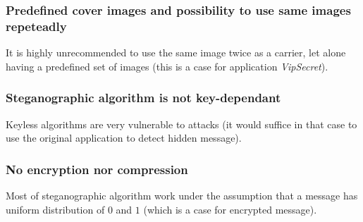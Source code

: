\subsubsection{Predefined cover images and possibility to use same images repeteadly}
It is highly unrecommended to use the same image twice as a carrier, let alone having 
a predefined set of images (this is a case for application \emph{VipSecret}).

\subsubsection{Steganographic algorithm is not key-dependant}
Keyless algorithms are very vulnerable to attacks (it would suffice in that case
to use the original application to detect hidden message).

\subsubsection{No encryption nor compression}
Most of steganographic algorithm work under the assumption that a message has uniform distribution
of $0$ and $1$ (which is a case for encrypted message).
